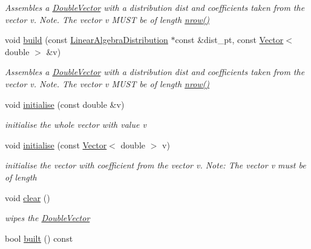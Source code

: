 \begin{DoxyCompactItemize}
\begin{DoxyCompactList}\small\item\em Assembles a \hyperlink{classoomph_1_1DoubleVector}{Double\+Vector} with a distribution dist and coefficients taken from the vector v. Note. The vector v M\+U\+ST be of length \hyperlink{classoomph_1_1DistributableLinearAlgebraObject_a7569556f14fd68b28508920e89bd5eee}{nrow()} \end{DoxyCompactList}\item 
void \hyperlink{classoomph_1_1DoubleVector_a4e6219936d6b23265b46dd3a25acb7c8}{build} (const \hyperlink{classoomph_1_1LinearAlgebraDistribution}{Linear\+Algebra\+Distribution} $\ast$const \&dist\+\_\+pt, const \hyperlink{classoomph_1_1Vector}{Vector}$<$ double $>$ \&v)
\begin{DoxyCompactList}\small\item\em Assembles a \hyperlink{classoomph_1_1DoubleVector}{Double\+Vector} with a distribution dist and coefficients taken from the vector v. Note. The vector v M\+U\+ST be of length \hyperlink{classoomph_1_1DistributableLinearAlgebraObject_a7569556f14fd68b28508920e89bd5eee}{nrow()} \end{DoxyCompactList}\item 
void \hyperlink{classoomph_1_1DoubleVector_a180c1057a29f4ed721da46040a619ecd}{initialise} (const double \&v)
\begin{DoxyCompactList}\small\item\em initialise the whole vector with value v \end{DoxyCompactList}\item 
void \hyperlink{classoomph_1_1DoubleVector_ae3ce2b88e72d8b084e9be8e9af10c487}{initialise} (const \hyperlink{classoomph_1_1Vector}{Vector}$<$ double $>$ v)
\begin{DoxyCompactList}\small\item\em initialise the vector with coefficient from the vector v. Note\+: The vector v must be of length \end{DoxyCompactList}\item 
void \hyperlink{classoomph_1_1DoubleVector_af1677445056759263b1b076966e7bfae}{clear} ()
\begin{DoxyCompactList}\small\item\em wipes the \hyperlink{classoomph_1_1DoubleVector}{Double\+Vector} \end{DoxyCompactList}\item 
bool \hyperlink{classoomph_1_1DoubleVector_aae402d422ec4344a4a45cdb7659b7161}{built} () const

\end{DoxyCompactItemize}
